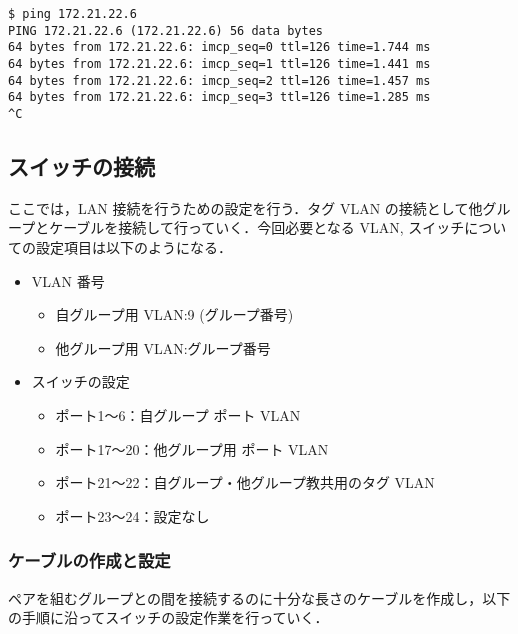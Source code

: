 \documentclass[a4j,titlepage]{jarticle}
\begin{document}
\begin{center}
\begin{screen}
\begin{verbatim}
$ ping 172.21.22.6
PING 172.21.22.6 (172.21.22.6) 56 data bytes
64 bytes from 172.21.22.6: imcp_seq=0 ttl=126 time=1.744 ms
64 bytes from 172.21.22.6: imcp_seq=1 ttl=126 time=1.441 ms
64 bytes from 172.21.22.6: imcp_seq=2 ttl=126 time=1.457 ms
64 bytes from 172.21.22.6: imcp_seq=3 ttl=126 time=1.285 ms
^C
\end{verbatim}
  \end{screen}
\end{center}


\subsection{スイッチの接続}
ここでは，LAN 接続を行うための設定を行う．タグ VLAN の接続として他グループとケーブルを接続して行っていく．今回必要となる VLAN, スイッチについての設定項目は以下のようになる．

\begin{itemize}
\item VLAN 番号
  \begin{itemize}
  \item 自グループ用 VLAN:9 (グループ番号)

  \item 他グループ用 VLAN:グループ番号

  \end{itemize}
      \end{itemize}

    \begin{itemize}
  \item スイッチの設定

    \begin{itemize}

    \item ポート1〜6：自グループ ポート VLAN

    \item ポート17〜20：他グループ用 ポート VLAN

    \item ポート21〜22：自グループ・他グループ教共用のタグ VLAN 

    \item ポート23〜24：設定なし

    \end{itemize}
    \end{itemize}

\subsubsection{ケーブルの作成と設定}
ペアを組むグループとの間を接続するのに十分な長さのケーブルを作成し，以下の手順に沿ってスイッチの設定作業を行っていく．
\end{document}
